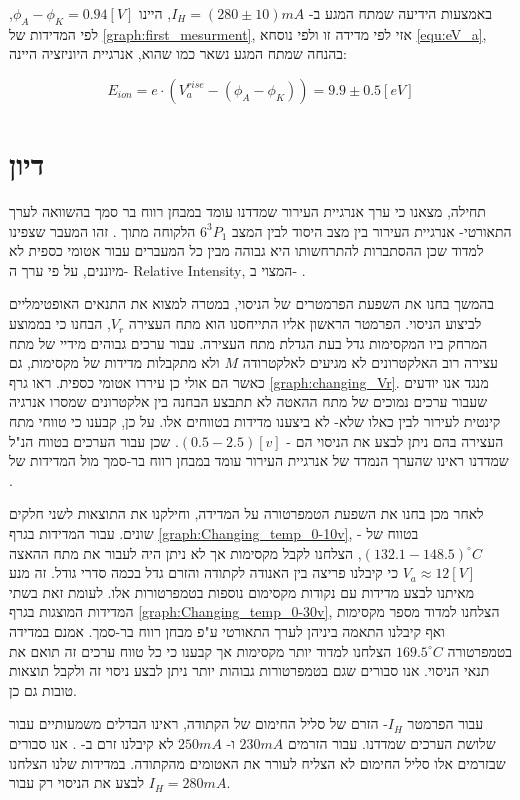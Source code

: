 \documentclass{article}
\newcommand*\circled[1]{\tikz[baseline=(char.base)]{
		            \node[shape=circle,draw,inner sep=1pt] (char) {#1};}}
\begin{document}
באמצעות הידיעה שמתח המגע ב-
$I_H = (280 \pm 10) mA$,
היינו
$\phi_A - \phi_K = 0.94 [V]$,
לפי המדידות של
\ref{graph:first_mesurment},
אזי לפי מדידה זו ולפי נוסחא
\ref{equ:eV_a},
בהנחה שמתח המגע נשאר כמו שהוא, אנרגיית היוניזציה היינה:

$$E_{ion} = e \cdot (V_a^{rise} - (\phi_A - \phi_K)) = 9.9 \pm 0.5 [eV]$$

\section{דיון}

תחילה, מצאנו כי ערך אנרגיית העירור שמדדנו עומד במבחן רווח בר סמך בהשוואה לערך התאורטי-  אנרגיית העירור בין מצב היסוד לבין המצב
$6^3P_1$
הלקוחה מתוך
\cite{NIST_ASD}.
זהו המעבר שצפינו למדוד שכן ההסתברות להתרחשותו היא גבוהה מבין כל המעברים עבור אטומי כספית לא מיוננים, על פי ערך
ה-
\textenglish{Relative Intensity},
המצוי ב-
\cite{NIST_ASD}.

בהמשך בחנו את השפעת הפרמטרים של הניסוי, במטרה למצוא את התנאים האופטימליים לביצוע הניסוי.
הפרמטר הראשון אליו התייחסנו הוא מתח העצירה
$V_r$,
הבחנו כי בממוצע המרחק ביו המקסימות גדל בעת הגדלת מתח העצירה.
עבור ערכים גבוהים מידיי של מתח עצירה רוב האלקטרונים לא מגיעים לאלקטרודה
$M$
ולא מתקבלות מדידות של מקסימות, גם כאשר הם אולי כן עיררו אטומי כספית. ראו גרף
\ref{graph:changing_Vr}.
מנגד אנו יודעים שעבור ערכים נמוכים של מתח ההאטה לא תתבצע הבחנה בין אלקטרונים שמסרו אנרגיה קינטית לעירור לבין כאלו שלא- לא ביצענו מדידות בטווחים אלו.
על כן, קבענו כי טווחי מתח העצירה בהם ניתן לבצע את הניסוי הם -
$(0.5 - 2.5)[v]$.
שכן עבור הערכים בטווח הנ"ל שמדדנו ראינו שהערך הנמדד של אנרגיית העירור עומד במבחן רווח בר-סמך מול המדידות של
\cite{NIST_ASD}.

לאחר מכן בחנו את השפעת הטמפרטורה על המדידה, וחילקנו את התוצאות לשני חלקים שונים.
עבור המדידות בגרף
\ref{graph:Changing_temp_0-10v},
- בטווח של
$(132.1 - 148.5)^{\circ}C$,
הצלחנו לקבל מקסימות אך לא ניתן היה לעבור את מתח ההאצה
$V_a \approx 12 [V]$
כי קיבלנו פריצה בין האנודה לקתודה והזרם גדל בכמה סדרי גודל. 
זה מנע מאיתנו לבצע מדידות עם נקודות מקסימום נוספות בטמפרטורות אלו. לעומת זאת בשתי המדידות המוצגות בגרף
\ref{graph:Changing_temp_0-30v},
הצלחנו למדוד מספר מקסימות ואף קיבלנו התאמה ביניהן לערך התאורטי ע"פ מבחן רווח בר-סמך. אמנם במדידה בטמפרטורה 
$169.5 ^{\circ}C$
הצלחנו למדוד יותר מקסימות אך קבענו כי כל טווח ערכים זה תואם את תנאי הניסוי.
אנו סבורים שגם בטמפרטורות גבוהות יותר ניתן לבצע ניסוי זה ולקבל תוצאות טובות גם כן.

עבור הפרמטר 
$I_H$-
הזרם של סליל החימום של הקתודה, ראינו הבדלים משמעותיים עבור שלושת הערכים שמדדנו. עבור הזרמים
$230 mA$
ו-
$250 mA$
לא קיבלנו זרם ב-
\circled{pA}.
אנו סבורים שבזרמים אלו סליל החימום לא הצליח לעורר את האטומים מהקתודה. במדידות שלנו הצלחנו לבצע את הניסוי רק עבור
$I_H = 280 mA$.
\end{document}
